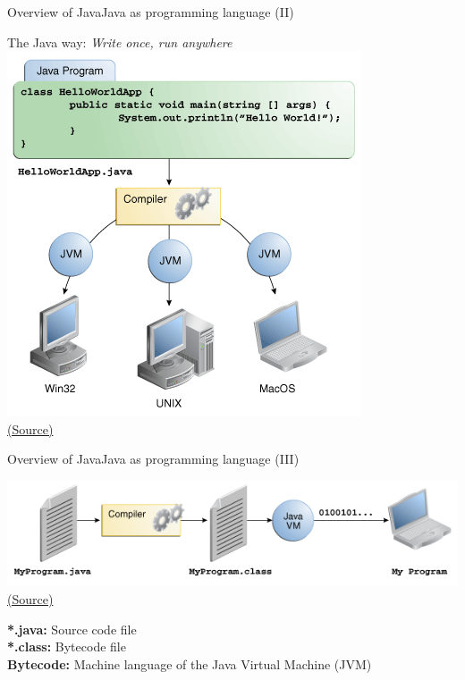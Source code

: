 \documentclass{beamer}
\begin{document}
\begin{frame}{Overview of Java}{Java as programming language (II)}
	\begin{center}
	The Java way: \textit{Write once, run anywhere}\\
	\smallskip
	\includegraphics[width=0.5\linewidth]{figs/helloWorld}\\
	\scriptsize{\href{http://docs.oracle.com/javase/tutorial/getStarted/intro/definition.html}{(Source)}}
	\end{center}
\end{frame}

\begin{frame}{Overview of Java}{Java as programming language (III)}
	\begin{center}
	\includegraphics[width=\linewidth]{figs/getStarted-compiler}\\
	\scriptsize{\href{http://docs.oracle.com/javase/tutorial/getStarted/intro/definition.html}{(Source)}}
	\end{center}
	\bigskip

	\normalsize{\textbf{*.java:} Source code file}\\
	\normalsize{\textbf{*.class:} Bytecode file}\\
	\normalsize{\textbf{Bytecode:} Machine language of the Java Virtual Machine (JVM)}
\end{frame}
\end{document}
